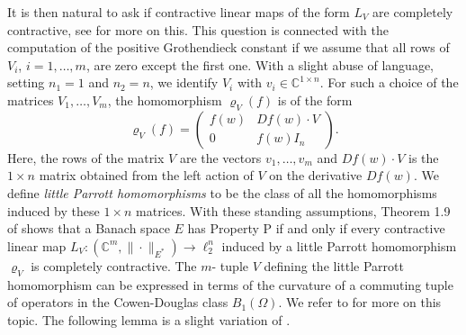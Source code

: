 \documentclass[a4paper,oneside,11pt, reqno]{amsart}
\numberwithin{equation}{section}
\theoremstyle{plain}
\begin{document}


 It is then natural to ask if contractive linear maps of the form $L_V$ are completely contractive, see \cite{vip} for more on this. This question is connected with the computation of the positive Grothendieck constant if we assume that all rows of $V_i$, $i=1, \ldots , m$, are zero except the first one. With a slight abuse of language, setting $n_1=1$ and $n_2=n$, we identify $V_i$ with $v_i \in \mathbb{C}^{1\times n}$.  For such a choice of the matrices $V_1, \ldots, V_m$, the homomorphism $\varrho_V(f)$ is of the form
\[\varrho_V(f)= \begin{pmatrix} f(w)  & Df(w) \cdot V \\ 0 & f(w)I_{n} \end{pmatrix}.\]
 Here, the rows of the matrix $V$ are the vectors $v_1, \ldots , v_m$ and $Df(w) \cdot V$ is the $1\times n$ matrix obtained from the left action of $V$ on the derivative $Df(w)$. 
 We define \textit{little Parrott homomorphisms} to be the class of all the homomorphisms induced by these $1\times n$ matrices.  With these standing assumptions, Theorem 1.9 of \cite{BM} shows that a Banach space $E$ has Property P if and only if every contractive linear map $L_V: (\mathbb{C}^m, \|\cdot\|_{E^*}) \to \ell_2^n$ induced by a little Parrott homomorphism $\varrho_V$ is completely contractive. The $m$- tuple $V$ defining the little Parrott homomorphism can be expressed in terms of the curvature of a commuting tuple of operators in the Cowen-Douglas class $B_1(\Omega)$. We refer to \cite{Misra901, Misra94, Misra19,  Misra902, vip, RKSBLMS} for more on this topic. The following lemma is a slight variation of  \cite[Theorem 1.9]{BM}. 
\end{document}
